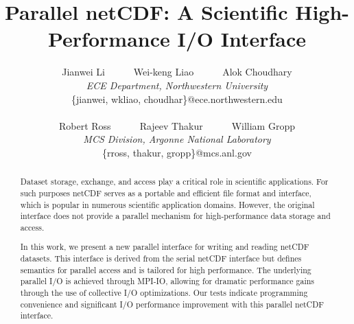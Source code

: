 \documentclass[10pt,twocolumn]{article}          %
\begin{document}
\title{Parallel netCDF: A Scientific High-Performance I/O Interface}


\author{
  Jianwei Li~~~~~~Wei-keng Liao~~~~~~Alok Choudhary \\
  {\em ECE Department, Northwestern University} \\
  \{jianwei, wkliao, choudhar\}@ece.northwestern.edu \\
  \\
  Robert Ross~~~~~~Rajeev Thakur~~~~~~William Gropp \\
  {\em MCS Division, Argonne National Laboratory} \\
  \{rross, thakur, gropp\}@mcs.anl.gov
}

\maketitle

\begin{abstract}

Dataset storage, exchange, and access play a critical role in scientific applications. For such
purposes netCDF serves as a portable and efficient file format and interface, which is popular in 
numerous scientific application domains. However, the original interface does not provide a
parallel mechanism for high-performance data storage and access.

In this work, we present a new parallel interface for writing and reading netCDF datasets. This
interface is derived from the serial netCDF interface but defines semantics for parallel access
and is tailored for high performance. The underlying parallel I/O is achieved through MPI-IO,
allowing for dramatic performance gains through the use of collective I/O optimizations. 
Our tests indicate programming convenience and
significant I/O performance improvement with this parallel netCDF interface.

\end{abstract}
\end{document}
